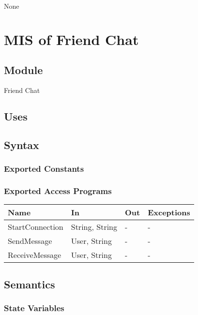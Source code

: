 \documentclass[12pt, titlepage]{article}
\begin{document}
\begin{itemize}
None

\newpage

\section{MIS of Friend Chat} \label{mFC}

\subsection{Module}

Friend Chat

\subsection{Uses}

\subsection{Syntax}

\subsubsection{Exported Constants}

\subsubsection{Exported Access Programs}

\begin{center}
\begin{tabular}{p{2cm} p{4cm} p{4cm} p{2cm}}
\hline
\textbf{Name} & \textbf{In} & \textbf{Out} & \textbf{Exceptions} \\
\hline
StartConnection & String, String & - & - \\
SendMessage & User, String & - & - \\
ReceiveMessage & User, String & - & - \\

\hline
\end{tabular}
\end{center}

\subsection{Semantics}

\subsubsection{State Variables}


\end{itemize}
\end{document}
